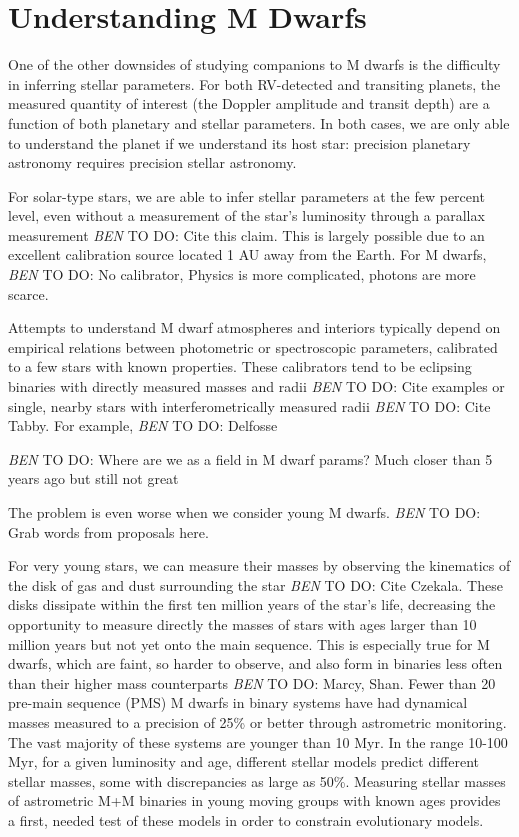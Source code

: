 \documentclass[12pt]{caltech_thesis}
\newcommand{\todo}[3]{{\color{#2} \emph{#1} TO DO: #3}}
\newcommand{\btmtodo}[1]{\todo{BEN}{red}{#1}}
\begin{document}
\section{Understanding M Dwarfs}
One of the other downsides of studying companions to M dwarfs is the difficulty 
in inferring stellar parameters.
For both RV-detected and transiting planets, the measured quantity of interest 
(the Doppler amplitude and transit depth) are a function of both planetary and stellar
parameters. 
In both cases, we are only able to understand the planet if we understand its host star:
precision planetary astronomy requires precision stellar astronomy.

For solar-type stars, we are able to infer stellar parameters at the few percent level,
even without a measurement of the star's luminosity through a parallax measurement
\btmtodo{Cite this claim}.
This is largely possible due to an excellent calibration source located 1 AU away from the 
Earth.
For M dwarfs, 
\btmtodo{No calibrator, Physics is more complicated, photons are more scarce.}

Attempts to understand M dwarf atmospheres and interiors typically depend on empirical 
relations between photometric or spectroscopic parameters, calibrated to a few stars
with known properties.
These calibrators tend to be eclipsing binaries with directly measured masses and radii \btmtodo{Cite 
examples} or single, nearby stars with interferometrically measured radii \btmtodo{Cite Tabby}.
For example, \btmtodo{Delfosse}

\btmtodo{Where are we as a field in M dwarf params? Much closer than 5 years ago
but still not great}

The problem is even worse when we consider young M dwarfs.
\btmtodo{Grab words from proposals here.}

For very young stars, we can measure their masses by observing the kinematics of
the disk of gas and dust surrounding the star \btmtodo{Cite Czekala}.
These disks dissipate within the first ten million years of the star's life, decreasing the opportunity to measure directly the masses of stars with ages larger than 10 million years but not yet onto the main sequence. 
This is especially true for M dwarfs, which are faint, so harder to observe, and also 
form in binaries less often than their higher mass counterparts \btmtodo{Marcy, Shan}.
Fewer than 20 pre-main sequence (PMS) M dwarfs in binary systems have had dynamical masses measured to a
precision of 25\% or better through astrometric monitoring.
The vast majority of these systems are younger than 10 Myr.
In the range 10-100 Myr, for a given luminosity and age, different stellar models predict different stellar masses, some with discrepancies as large as 50\%.
Measuring stellar masses of astrometric M+M binaries in young moving groups with known 
ages provides a first, needed test of these models in order to constrain evolutionary models.
\end{document}
